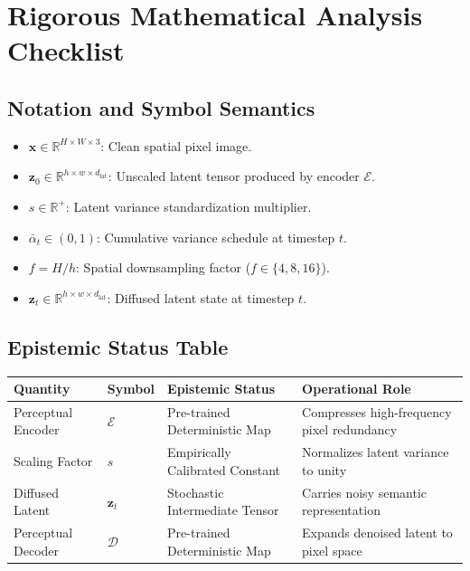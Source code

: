 \documentclass[11pt,a4paper]{article}
\theoremstyle{definition}
\begin{document}
\section{Rigorous Mathematical Analysis Checklist}

\subsection{Notation and Symbol Semantics}
\begin{itemize}
    \item $\mathbf{x} \in \mathbb{R}^{H \times W \times 3}$: Clean spatial pixel image.
    \item $\mathbf{z}_0 \in \mathbb{R}^{h \times w \times d_{\text{lat}}}$: Unscaled latent tensor produced by encoder $\mathcal{E}$.
    \item $s \in \mathbb{R}^+$: Latent variance standardization multiplier.
    \item $\bar{\alpha}_t \in (0, 1)$: Cumulative variance schedule at timestep $t$.
    \item $f = H / h$: Spatial downsampling factor ($f \in \{4, 8, 16\}$).
    \item $\mathbf{z}_t \in \mathbb{R}^{h \times w \times d_{\text{lat}}}$: Diffused latent state at timestep $t$.
\end{itemize}

\subsection{Epistemic Status Table}
\begin{table}[h]
\centering
\small
\begin{tabular}{@{}llll@{}}
\toprule
\textbf{Quantity} & \textbf{Symbol} & \textbf{Epistemic Status} & \textbf{Operational Role} \\
\midrule
Perceptual Encoder & $\mathcal{E}$ & Pre-trained Deterministic Map & Compresses high-frequency pixel redundancy \\
Scaling Factor & $s$ & Empirically Calibrated Constant & Normalizes latent variance to unity \\
Diffused Latent & $\mathbf{z}_t$ & Stochastic Intermediate Tensor & Carries noisy semantic representation \\
Perceptual Decoder & $\mathcal{D}$ & Pre-trained Deterministic Map & Expands denoised latent to pixel space \\
\bottomrule
\end{tabular}
\end{table}
\end{document}
